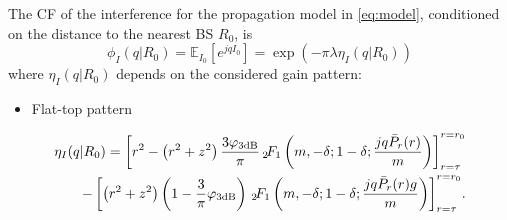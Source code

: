 \begin{proposition}\label{prop:cf}
    The CF of the interference for the propagation model in \eqref{eq:model}, conditioned on the distance to the nearest BS $R_0$, is
    \begin{equation}
        \phi_I(q|R_0) = \mathbb E_{I_0}\left[e^{jq {I_0}}\right] = \exp(-\pi \lambda \eta_I(q|R_0))
    \end{equation}
    where $\eta_I(q|R_0)$ depends on the considered gain pattern:

    \begin{itemize}
        \item {Flat-top pattern}
    \end{itemize} 
{\footnotesize
\begin{equation}
    \begin{split}
        \eta_I(q|R_0) =  \left[r^2-\left(r^2+z^2\right)\frac{3\varphi_{3\textrm{\normalfont dB}}}{\pi} \,_2\!F_1\left(m, -\delta;1-\delta;\frac{j q \Bar{P}_r(r)}{m}\right) \right]_{r = \tau}^{r=r_0}\\
        -\left[\left(r^2+z^2\right)\left(1-\frac{3}{\pi}\varphi_{3\textrm{\normalfont dB}}\right) \,_2\!F_1\left(m, -\delta;1-\delta;\frac{j q \Bar{P}_r(r)g}{m}\right) \right]_{r = \tau}^{r=r_0}\!.
    \end{split}
\end{equation}}


\end{proposition}
